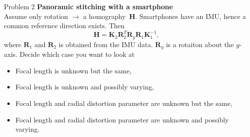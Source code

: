 \documentclass[aspectratio=169]{beamer}
\newcommand{\mat}[1]{\bm{#1}}
\newcommand{\T}{T}
\begin{document}
\begin{frame}{Problem 2}
\textbf{Panoramic stitching with a smartphone}\\[2mm]
Assume only rotation $\longrightarrow$ a homography~$\mat{H}$. Smartphones have an
IMU, hence a common reference direction exists. Then
\begin{equation*}
    \mat{H} = \mat{K}_2\mat{R}_2^\T\mat{R}_y\mat{R}_1\mat{K}_1^{-1},
\end{equation*}
where $\mat{R}_1$ and $\mat{R}_2$ is obtained from the IMU data. $\mat{R}_y$ is
a rotaiton about the $y$-axis.
Decide which case you want to look at
\begin{itemize}
    \item Focal length is unknown but the same,
    \item Focal length is unknown and possibly varying,
    \item Focal length and radial distortion parameter are unknown but the same,
    \item Focal length and radial distortion parameter are unknown and possibly varying.
\end{itemize}
\end{frame}
\end{document}
